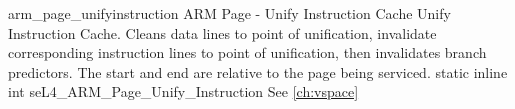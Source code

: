 %
%
%
%

\apidoc
{arm_page_unifyinstruction}
{ARM Page - Unify Instruction Cache}
{Unify Instruction Cache. Cleans data lines to point of unification, invalidate 
corresponding instruction lines to point of unification, then invalidates branch
predictors. The start and end are relative to the page being
serviced.}
{static inline int seL4\_ARM\_Page\_Unify\_Instruction}
{
}
{\errorenumdesc}
{See \autoref{ch:vspace}}

